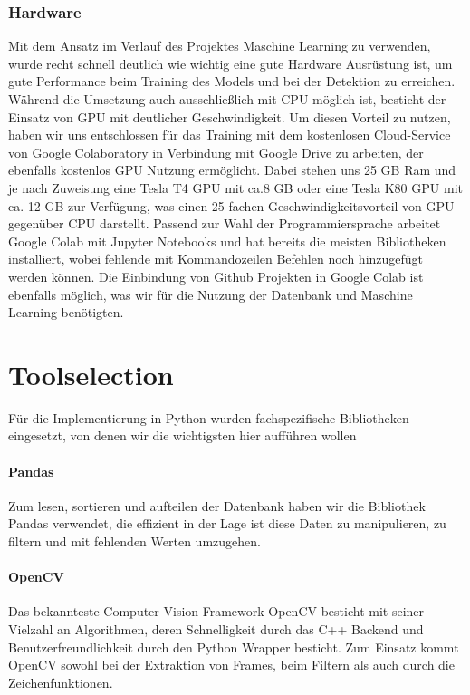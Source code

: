 \subsubsection*{Hardware}
Mit dem Ansatz im Verlauf des Projektes Maschine Learning zu verwenden, wurde recht schnell deutlich wie wichtig eine gute Hardware Ausrüstung ist, um gute Performance beim Training des Models und bei der Detektion zu erreichen. Während die Umsetzung auch ausschließlich mit CPU möglich ist, besticht der Einsatz von GPU mit deutlicher Geschwindigkeit. Um diesen Vorteil zu nutzen, haben wir uns entschlossen für das Training mit dem kostenlosen Cloud-Service von Google Colaboratory in Verbindung mit Google Drive zu arbeiten, der ebenfalls kostenlos GPU Nutzung ermöglicht. Dabei stehen uns 25 GB Ram und je nach Zuweisung eine Tesla T4 GPU mit ca.8 GB oder eine Tesla K80 GPU mit ca. 12 GB zur Verfügung, was einen 25-fachen Geschwindigkeitsvorteil von GPU gegenüber CPU darstellt. Passend zur Wahl der Programmiersprache arbeitet Google Colab mit Jupyter Notebooks und hat bereits die meisten Bibliotheken installiert, wobei fehlende mit Kommandozeilen Befehlen noch hinzugefügt werden können. Die Einbindung von Github Projekten in Google Colab ist ebenfalls möglich, was wir für die Nutzung der Datenbank und Maschine Learning benötigten.

\section{Toolselection}
Für die Implementierung in Python wurden fachspezifische Bibliotheken eingesetzt, von denen wir die wichtigsten hier aufführen wollen
\paragraph{Pandas}
Zum lesen, sortieren und aufteilen der Datenbank haben wir die Bibliothek Pandas verwendet, die effizient in der Lage ist diese Daten zu manipulieren, zu filtern und mit fehlenden Werten umzugehen.

\paragraph{OpenCV}
Das bekannteste Computer Vision Framework OpenCV besticht mit seiner Vielzahl an Algorithmen, deren Schnelligkeit durch das C++ Backend und Benutzerfreundlichkeit durch den Python Wrapper besticht. Zum Einsatz kommt OpenCV sowohl bei der Extraktion von Frames, beim Filtern als auch durch die Zeichenfunktionen.

